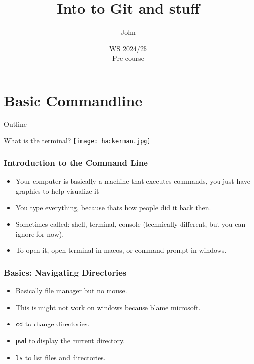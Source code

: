 \documentclass[aspectratio=169,hyperref={unicode}]{beamer}
\title{Into to Git and stuff}
\author{John}
\institute{Fachschaft General \& Computational Linguistics\\ \textbf{University of Tübingen}}
\date{WS 2024/25 \\ Pre-course}
\begin{document}
\begin{frame}
\titlepage
\end{frame}

\section{Basic Commandline}

\begin{frame}{Outline}
\tableofcontents[currentsection]
\end{frame}

\begin{frame}

  What is the terminal?
\texttt{[image: hackerman.jpg]}
\end{frame}


\begin{frame}
\frametitle{Introduction to the Command Line}

\begin{itemize}
\item Your computer is basically a machine that executes commands, you just have graphics to help visualize it
\item You type everything, because thats how people did it back then.
\item Sometimes called: shell, terminal, console (technically different, but you can ignore for now).
        \item To open it, open terminal in macos, or command prompt in windows.
\end{itemize}
\end{frame}

\begin{frame}[fragile]
\frametitle{Basics: Navigating Directories}
\begin{itemize}
\item Basically file manager but no mouse.
\item This is might not work on windows because blame microsoft.
\item \texttt{cd} to change directories.
\item \texttt{pwd} to display the current directory.
\item \texttt{ls} to list files and directories.
\end{itemize}
\end{frame}
\end{document}
